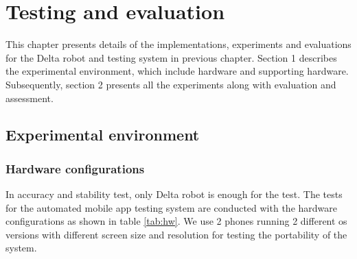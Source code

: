 \chapter{Testing and evaluation}

This chapter presents details of the implementations, experiments and evaluations for the Delta robot and testing system in previous chapter. Section 1 describes the experimental environment, which include hardware and supporting hardware. Subsequently, section 2 presents all the experiments along with evaluation and assessment.

\section{Experimental environment}
\subsection{Hardware configurations}
In accuracy and stability test, only Delta robot is enough for the test. The tests for the automated mobile app testing system are conducted with the hardware configurations as shown in table \ref{tab:hw}. We use 2 phones running 2 different \acrshort{os} versions with different screen size and resolution for testing the portability of the system.

